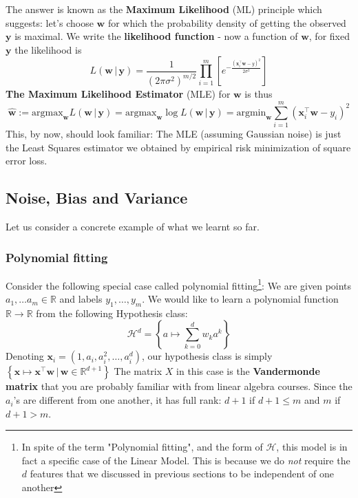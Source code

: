 \documentclass[11pt]{article}
\newcommand{\R}{\ensuremath{\mathbb{R}}}
\newcommand{\Tr}{\ensuremath{\top}}
\newcommand{\Hc}{\mathcal{H}}
\begin{document}
The answer is known as the {\bf Maximum Likelihood} (ML) principle which suggests: let's choose $\mathbf{w}$ for which the probability density of getting the observed $\mathbf{y}$ is maximal.
We write the {\bf likelihood function} - now a function of  $\mathbf{w}$, for fixed $\mathbf{y}$ the likelihood is
          \[
            L(\mathbf{w}\, |\, \mathbf{y}) = \frac{1}{(2\pi \sigma^2)^{m/2}}
            \prod_{i=1}^m \left[ e^{-\frac{(\mathbf{x}_i^\Tr \mathbf{w}-y)^2}{2\sigma^2}}\right]
          \]
\textbf{The Maximum Likelihood Estimator} (MLE) for $\mathbf{w}$ is thus
          \[
            \hat{\mathbf{w}}:=\text{argmax}_\mathbf{w} L(\mathbf{w}\, |\, \mathbf{y}) =
            \text{argmax}_\mathbf{w} \log L(\mathbf{w}\, |\, \mathbf{y}) =
            \text{argmin}_\mathbf{w} \sum_{i=1}^m(\mathbf{x}_i^\Tr \mathbf{w} -y_i)^2
          \]
This, by now, should look familiar: The MLE (assuming Gaussian noise) is just the Least Squares estimator we obtained by empirical risk minimization of square error loss.


\subsection{Noise, Bias and Variance}

Let us consider a concrete example of what we learnt so far.

\subsubsection{Polynomial fitting}

Consider the following special case called polynomial fitting\footnote{In spite of the term "Polynomial fitting", and the form of $\Hc$, this model is in fact a specific case of the Linear Model.
This is because we do \emph{not} require the $d$ features that we discussed in previous sections to be independent of one another}:
We are given points $a_1,\ldots a_m\in \R$  and labels $y_1,\ldots,y_m$.
We would like to learn a polynomial function $\R\to\R$ from the following Hypothesis class:
                \[
                  \Hc^d=\left\{ a\mapsto  \sum_{k=0}^d w_k a^k \right\}
                \]
 Denoting $\mathbf{x}_i=(1,a_i,a_i^2,\ldots,a_i^d)$, our hypothesis class is simply
                $\left\{ \mathbf{x}\mapsto \mathbf{x}^\Tr \mathbf{w}  \,|\,
                \mathbf{w}\in\R^{d+1}\right \}$
The matrix $X$ in this case is the \textbf{Vandermonde matrix} that you are probably familiar with from linear algebra courses. Since the $a_i$'s are different from one another, it has full rank:
$d+1$ if $d+1\leq m$ and $m$ if $d+1> m$.
\end{document}
